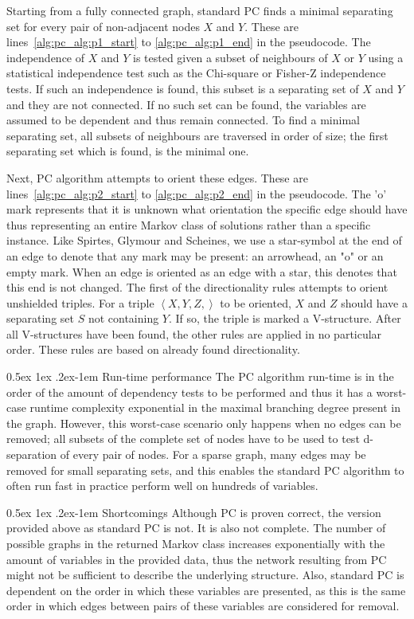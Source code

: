 \documentclass[a4paper, 10pt, english, onecolumn]{article}
\makeatletter
\renewcommand{\paragraph}{%
  \@startsection{paragraph}{4}%
  {\z@}{0.5ex \@plus 1ex \@minus .2ex}{-1em}%
  {\normalfont\normalsize\bfseries}%
}
\makeatother
\begin{document}
Starting from a fully connected graph, standard PC finds a minimal separating set for every pair of non-adjacent nodes $X$ and $Y$.
These are lines~\ref{alg:pc_alg:p1_start} to \ref{alg:pc_alg:p1_end} in the pseudocode.
The independence of $X$ and $Y$ is tested given a subset of neighbours of $X$ or $Y$ using a statistical independence test such as the Chi-square or Fisher-Z independence tests.
If such an independence is found, this subset is a separating set of $X$ and $Y$ and they are not connected.
If no such set can be found, the variables are assumed to be dependent and thus remain connected.
To find a minimal separating set, all subsets of neighbours are traversed in order of size; the first separating set which is found, is the minimal one.

Next, PC algorithm attempts to orient these edges.
These are lines~\ref{alg:pc_alg:p2_start} to \ref{alg:pc_alg:p2_end} in the pseudocode.
The 'o' mark represents that it is unknown what orientation the specific edge should have thus representing an entire Markov class of solutions rather than a specific instance.
Like Spirtes, Glymour and Scheines, we use a star-symbol at the end of an edge to denote that any mark may be present: an arrowhead, an "o" or an empty mark.
When an edge is oriented as an edge with a star, this denotes that this end is not changed.
The first of the directionality rules attempts to orient unshielded triples.
For a triple $\left < X,Y,Z, \right>$ to be oriented, $X$ and $Z$ should have a separating set $S$ not containing $Y$.
If so, the triple is marked a V-structure.
After all V-structures have been found, the other rules are applied in no particular order.
These rules are based on already found directionality.

\paragraph{Run-time performance}
The PC algorithm run-time is in the order of the amount of dependency tests to be performed and thus it has a worst-case runtime complexity exponential in the maximal branching degree present in the graph.
However, this worst-case scenario only happens when no edges can be removed; all subsets of the complete set of nodes have to be used to test d-separation of every pair of nodes.
For a sparse graph, many edges may be removed for small separating sets, and this enables the standard PC algorithm to often run fast in practice perform well on hundreds of variables.

\paragraph{Shortcomings}
Although PC is proven correct, the version provided above as standard PC is not.
It is also not complete.
The number of possible graphs in the returned Markov class increases exponentially with the amount of variables in the provided data, thus the network resulting from PC might not be sufficient to describe the underlying structure.
Also, standard PC is dependent on the order in which these variables are presented, as this is the same order in which edges between pairs of these variables are considered for removal\cite[p.88]{spirtes2000}.
\end{document}
